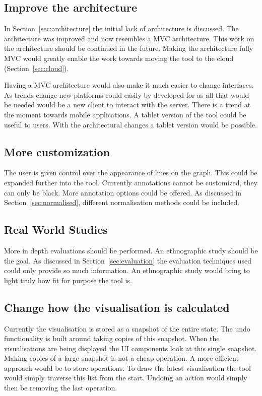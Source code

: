 \subsection{Improve the architecture}

In Section~\ref{sec:architecture} the initial lack of architecture is discussed.  The architecture was improved and now resembles a \ac{MVC} architecture.  This work on the architecture should be continued in the future.  Making the architecture fully \ac{MVC} would greatly enable the work towards moving the tool to the cloud (Section~\ref{sec:cloud}).

Having a \ac{MVC} architecture would also make it much easier to change interfaces.  As trends change new platforms could easily by developed for as all that would be needed would be a new client to interact with the server.  There is a trend at the moment towards mobile applications.  A tablet version of the tool could be useful to users.  With the architectural changes a tablet version would be possible.

\subsection{More customization}
The user is given control over the appearance of lines on the graph.  This could be expanded further into the tool.  Currently annotations cannot be customized, they can only be black.  More annotation options could be offered.  As discussed in Section~\ref{sec:normalised}, different normalisation methods could be included.

\subsection{Real World Studies}
More in depth evaluations should be performed.  An ethnographic study should be the goal.  As discussed in Section~\ref{sec:evaluation} the evaluation techniques used could only provide so much information.  An ethnographic study would bring to light truly how fit for purpose the tool is.

\subsection{Change how the visualisation is calculated}
Currently the visualisation is stored as a snapshot of the entire state.  The undo functionality is built around taking copies of this snapshot. When the visualisations are being displayed the \ac{UI} components look at this single snapshot.  Making copies of a large snapshot is not a cheap operation.  A more efficient approach would be to store operations.  To draw the latest visualisation the tool would simply traverse this list from the start.  Undoing an action would simply then be removing the last operation.

